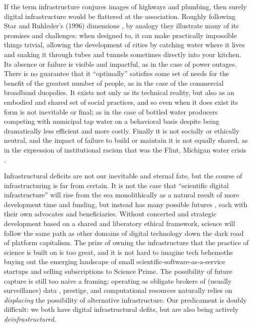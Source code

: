 \documentclass[10pt]{article}
\begin{document}
\begin{multicols}{2}
If the term infrastructure conjures images of highways and plumbing,
then surely digital infrastructure would be flattered at the
association. Roughly following Star and Ruhleder's (1996) dimensions
\cite{starStepsEcologyInfrastructure1996} , by analogy they
illustrate many of its promises and challenges: when designed to, it can
make practically impossible things trivial, allowing the development of
cities by catching water where it lives and snaking it through tubes and
tunnels sometimes directly into your kitchen. Its absence or failure is
visible and impactful, as in the case of power outages. There is no
guarantee that it ``optimally'' satisfies some set of needs for the
benefit of the greatest number of people, as in the case of the
commercial broadband duopolies. It exists not only as its technical
reality, but also as an embodied and shared set of social practices, and
so even when it does exist its form is not inevitable or final; as in
the case of bottled water producers competing with municipal tap water
on a behavioral basis despite being dramatically less efficient and more
costly. Finally it is not socially or ethically neutral, and the impact
of failure to build or maintain it is not equally shared, as in the
expression of institutional racism that was the Flint, Michigan water
crisis \cite{michicancivilrightscommissionFlintWaterCrisis2017} .

Infrastructural deficits are not our inevitable and eternal fate, but
the course of infrastructuring is far from certain. It is not the case
that ``scientific digital infrastructure'' will rise from the sea
monolithically as a natural result of more development time and funding,
but instead has many possible futures\cite{mirowskiFutureOpenScience2018} , each with their own advocates and
beneficiaries. Without concerted and strategic development based on a
shared and liberatory ethical framework, science will follow the same
path as other domains of digital technology down the dark road of
platform capitalism. The prize of owning the infrastructure that the
practice of science is built on is too great, and it is not hard to
imagine tech behemoths buying out the emerging landscape of small
scientific-software-as-a-service startups and selling subscriptions to
Science Prime. The possibility of future capture is still too naive a
framing: operating as obligate brokers of (usually surveillance)
data\cite{pooleySurveillancePublishing2021, zuboffBigOtherSurveillance2015, warkCapitalDeadThis2021} , prestige,
and computational resources naturally relies on \emph{displacing} the
possibility of alternative infrastructure. Our predicament is doubly
difficult: we both have digital infrastructural defits, but are also
being actively \emph{deinfrastructured.}


\end{multicols}
\end{document}
